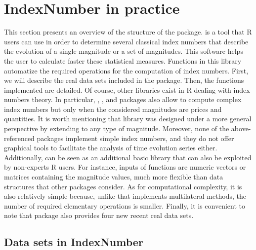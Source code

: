\section{IndexNumber in practice}\label{indexnumberinpractice}\vspace{-0.3 cm}
This section presents an overview of the structure of the package.  is a tool that R users can use in order to determine  several classical index numbers that describe the evolution of a single magnitude or a set of magnitudes. This software helps the user to calculate faster these statistical measures. Functions in this library automatize the required operations for the computation of index numbers. First, we will describe the real data sets included in the package. Then, the functions implemented are detailed. Of course, other libraries exist in R dealing with index numbers theory. In particular,  \citep{micEconIndex},  \citep{indexnumR}, and  \citep{PriceIndices} packages also allow to compute complex index numbers but only when the considered magnitudes are prices and quantities. It is worth mentioning that  library was designed under a more general perspective by extending to any type of magnitude. Moreover, none of the above-referenced packages implement simple index numbers, and they do not offer graphical tools to facilitate the analysis of time evolution series either. Additionally,  can be seen as an additional basic  library that can also be exploited by non-experts R users. For instance, inputs of functions are numeric vectors or matrices containing the magnitude values, much more flexible than data structures that other packages consider. As for computational complexity, it is also relatively simple because, unlike  that implements multilateral methods, the number of required elementary operations is smaller. Finally, it is convenient to note that  package also provides four new recent real data sets.\vspace{-0.15 cm}


\subsection{Data sets in IndexNumber}

